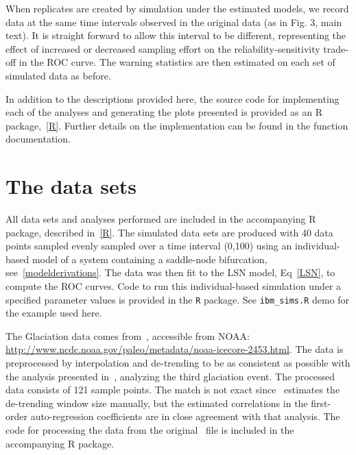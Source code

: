 \documentclass[authoryear, preprint,review,12pt]{elsarticle}
\begin{document}
When replicates are created by simulation under the estimated models, we record data at the same time intervals observed in the original data (as in Fig. 3, main text).  It is straight forward to allow this interval to be different, representing the effect of increased or decreased sampling effort on the reliability-sensitivity trade-off in the ROC curve.  The warning statistics are then estimated on each set of simulated data as before. 

In addition to the descriptions provided here, the source code for implementing each of the analyses and generating the plots presented is provided as an R package,~\ref{R}. Further details on the implementation can be found in the function documentation. 

\section{The data sets}\label{data}
All data sets and analyses performed are included in the accompanying R package, described in~\ref{R}.
The simulated data sets are produced with 40 data points
sampled evenly sampled over a time interval (0,100) using an individual-based model of a system containing a saddle-node bifurcation, see~\ref{modelderivations}.  The data was then fit to the LSN model, Eq~\eqref{LSN}, to compute the ROC curves. Code to run this individual-based simulation under a specified parameter values is provided in the \texttt{R} package.  See \verb|ibm_sims.R| demo for the example used here.  

The Glaciation data comes from~\citet{Petit1999}, accessible from NOAA:\\
\href{http://www.ncdc.noaa.gov/paleo/metadata/noaa-icecore-2453.html}{http://www.ncdc.noaa.gov/paleo/metadata/noaa-icecore-2453.html}.
The data is preprocessed by interpolation and de-trending to be as consistent as possible with the analysis presented in~\citet{Dakos2008},
analyzing the third glaciation event. 
The processed data consists of 121 sample points. 
The match is not exact since~\citet{Dakos2008} estimates the de-trending window size manually,
but the estimated correlations in the first-order auto-regression coefficients are in close agreement with that analysis. 
The code for processing the data from the original~\citet{Petit1999} file is included in the accompanying R package.  
\end{document}
